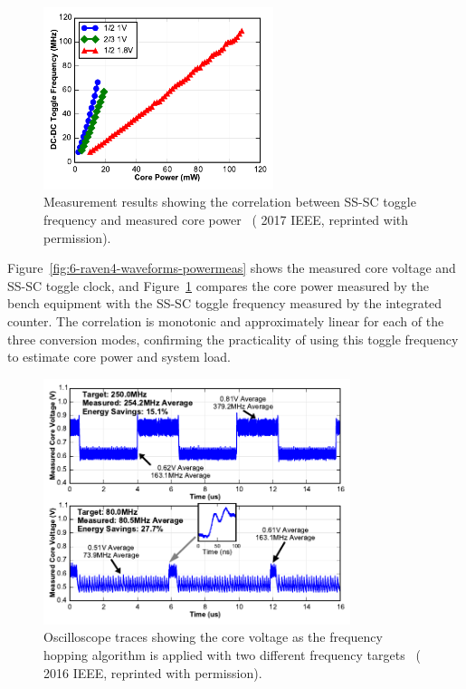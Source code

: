 \documentclass[graybox]{svmult}
\begin{document}
\begin{figure}
  \centering
  \includegraphics[width=0.6\textwidth]{6-raven4-powermeas}
  \caption{Measurement results showing the correlation between SS-SC toggle frequency and measured core power~\cite{Keller2017} ({\textcopyright} 2017 IEEE, reprinted with permission).}
  \label{fig:6-raven4-powermeas}
\end{figure}

Figure~\ref{fig:6-raven4-waveforms-powermeas} shows the measured core voltage and SS-SC toggle clock, and Figure~\ref{fig:6-raven4-powermeas} compares the core power measured by the bench equipment with the SS-SC toggle frequency measured by the integrated counter.
The correlation is monotonic and approximately linear for each of the three conversion modes, confirming the practicality of using this toggle frequency to estimate core power and system load.

\begin{figure}
  \centering
  \includegraphics[width=0.8\textwidth]{6-raven4-freqhopping}
  \caption{Oscilloscope traces showing the core voltage as the frequency hopping algorithm is applied with two different frequency targets~\cite{Keller2016} ({\textcopyright} 2016 IEEE, reprinted with permission).}
  \label{fig:6-raven4-freqhopping}
\end{figure}
\end{document}
